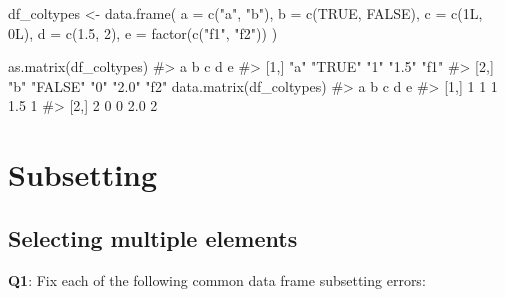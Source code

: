\documentclass[
]{krantz}
\makeatletter
\newenvironment{Shaded}{\begin{snugshade}}{\end{snugshade}}
\newcommand{\CommentTok}[1]{\textcolor[rgb]{0.56,0.35,0.01}{\textit{#1}}}
\newcommand{\DataTypeTok}[1]{\textcolor[rgb]{0.13,0.29,0.53}{#1}}
\newcommand{\DecValTok}[1]{\textcolor[rgb]{0.00,0.00,0.81}{#1}}
\newcommand{\FloatTok}[1]{\textcolor[rgb]{0.00,0.00,0.81}{#1}}
\newcommand{\KeywordTok}[1]{\textcolor[rgb]{0.13,0.29,0.53}{\textbf{#1}}}
\newcommand{\NormalTok}[1]{#1}
\newcommand{\OperatorTok}[1]{\textcolor[rgb]{0.81,0.36,0.00}{\textbf{#1}}}
\newcommand{\OtherTok}[1]{\textcolor[rgb]{0.56,0.35,0.01}{#1}}
\newcommand{\StringTok}[1]{\textcolor[rgb]{0.31,0.60,0.02}{#1}}
\newenvironment{kframe}{%
\medskip{}
\setlength{\fboxsep}{.8em}
 \def\at@end@of@kframe{}%
 \ifinner\ifhmode%
  \def\at@end@of@kframe{\end{minipage}}%
  \begin{minipage}{\columnwidth}%
 \fi\fi%
 \def\FrameCommand##1{\hskip\@totalleftmargin \hskip-\fboxsep
 \colorbox{shadecolor}{##1}\hskip-\fboxsep
     \hskip-\linewidth \hskip-\@totalleftmargin \hskip\columnwidth}%
 \MakeFramed {\advance\hsize-\width
   \@totalleftmargin\z@ \linewidth\hsize
   \@setminipage}}%
 {\par\unskip\endMakeFramed%
 \at@end@of@kframe}
\renewenvironment{Shaded}{\begin{kframe}}{\end{kframe}}
\renewcommand{\KeywordTok} [1]{\textcolor[rgb]{0.00,0.44,0.13}{{#1}}}
\renewcommand{\DataTypeTok}[1]{\textcolor[rgb]{0.56,0.13,0.00}{{#1}}}
\renewcommand{\DecValTok}  [1]{\textcolor[rgb]{0.25,0.63,0.44}{{#1}}}
\renewcommand{\FloatTok}   [1]{\textcolor[rgb]{0.25,0.63,0.44}{{#1}}}
\renewcommand{\StringTok}  [1]{\textcolor[rgb]{0.25,0.44,0.63}{{#1}}}
\renewcommand{\CommentTok} [1]{\textcolor[rgb]{0.38,0.63,0.69}{{#1}}}
\renewcommand{\OtherTok}   [1]{\textcolor[rgb]{0.00,0.44,0.13}{{#1}}}
\renewcommand{\NormalTok}  [1]{{#1}}
\makeatother
\begin{document}
\begin{Shaded}
\begin{Highlighting}[]
\NormalTok{df_coltypes <-}\StringTok{ }\KeywordTok{data.frame}\NormalTok{(}
  \DataTypeTok{a =} \KeywordTok{c}\NormalTok{(}\StringTok{"a"}\NormalTok{, }\StringTok{"b"}\NormalTok{),}
  \DataTypeTok{b =} \KeywordTok{c}\NormalTok{(}\OtherTok{TRUE}\NormalTok{, }\OtherTok{FALSE}\NormalTok{),}
  \DataTypeTok{c =} \KeywordTok{c}\NormalTok{(1L, 0L),}
  \DataTypeTok{d =} \KeywordTok{c}\NormalTok{(}\FloatTok{1.5}\NormalTok{, }\DecValTok{2}\NormalTok{),}
  \DataTypeTok{e =} \KeywordTok{factor}\NormalTok{(}\KeywordTok{c}\NormalTok{(}\StringTok{"f1"}\NormalTok{, }\StringTok{"f2"}\NormalTok{))}
\NormalTok{)}

\KeywordTok{as.matrix}\NormalTok{(df_coltypes)}
\CommentTok{#>      a   b       c   d     e   }
\CommentTok{#> [1,] "a" "TRUE"  "1" "1.5" "f1"}
\CommentTok{#> [2,] "b" "FALSE" "0" "2.0" "f2"}
\KeywordTok{data.matrix}\NormalTok{(df_coltypes)}
\CommentTok{#>      a b c   d e}
\CommentTok{#> [1,] 1 1 1 1.5 1}
\CommentTok{#> [2,] 2 0 0 2.0 2}
\end{Highlighting}
\end{Shaded}

\hypertarget{subsetting}{%
\chapter{Subsetting}\label{subsetting}}


\hypertarget{selecting-multiple-elements}{%
\section{Selecting multiple elements}\label{selecting-multiple-elements}}

\textbf{{Q1}}: Fix each of the following common data frame subsetting errors:

\begin{Shaded}
\end{Shaded}
\end{document}
